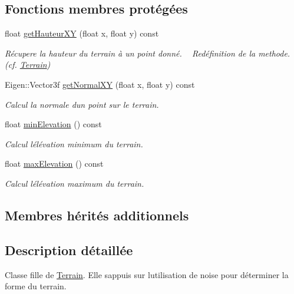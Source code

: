 \subsection*{Fonctions membres protégées}
\begin{DoxyCompactItemize}
\item 
float \hyperlink{class_terrain_noise_a4173f17958ed358f9b4a6b005b0ed256}{get\+Hauteur\+X\+Y} (float x, float y) const 
\begin{DoxyCompactList}\small\item\em Récupere la hauteur du terrain à un point donné. ~\newline
Redéfinition de la methode. (cf. \hyperlink{class_terrain}{Terrain}) \end{DoxyCompactList}\item 
Eigen\+::\+Vector3f \hyperlink{class_terrain_noise_af50426bd1451cec938411d6bb5f82ac0}{get\+Normal\+X\+Y} (float x, float y) const 
\begin{DoxyCompactList}\small\item\em Calcul la normale d\textquotesingle{}un point sur le terrain. \end{DoxyCompactList}\item 
float \hyperlink{class_terrain_noise_abb3e61d20aaccdb513355b59b7b02af4}{min\+Elevation} () const 
\begin{DoxyCompactList}\small\item\em Calcul l\textquotesingle{}élévation minimum du terrain. \end{DoxyCompactList}\item 
float \hyperlink{class_terrain_noise_a3ce920d78a9e4e86e50c7244f8deb055}{max\+Elevation} () const 
\begin{DoxyCompactList}\small\item\em Calcul l\textquotesingle{}élévation maximum du terrain. \end{DoxyCompactList}\end{DoxyCompactItemize}
\subsection*{Membres hérités additionnels}


\subsection{Description détaillée}
Classe fille de \hyperlink{class_terrain}{Terrain}. Elle s\textquotesingle{}appuis sur l\textquotesingle{}utilisation de noise pour déterminer la forme du terrain. 

